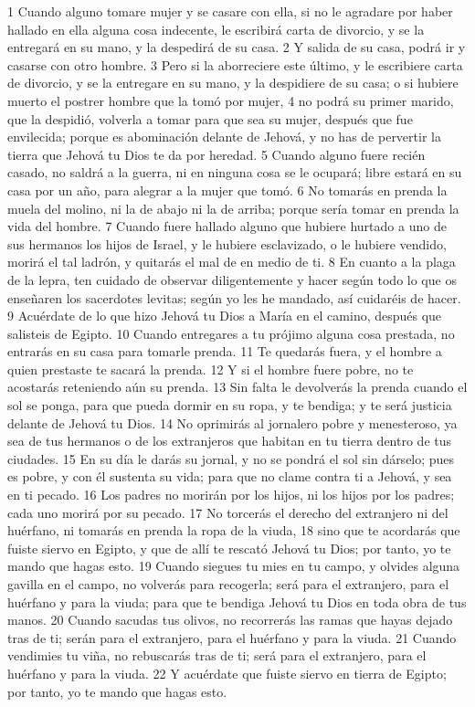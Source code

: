 1 Cuando alguno tomare mujer y se casare con ella, si no le agradare por haber hallado en ella alguna cosa indecente, le escribirá carta de divorcio, y se la entregará en su mano, y la despedirá de su casa.
2 Y salida de su casa, podrá ir y casarse con otro hombre.
3 Pero si la aborreciere este último, y le escribiere carta de divorcio, y se la entregare en su mano, y la despidiere de su casa; o si hubiere muerto el postrer hombre que la tomó por mujer,
4 no podrá su primer marido, que la despidió, volverla a tomar para que sea su mujer, después que fue envilecida; porque es abominación delante de Jehová, y no has de pervertir la tierra que Jehová tu Dios te da por heredad.
5 Cuando alguno fuere recién casado, no saldrá a la guerra, ni en ninguna cosa se le ocupará; libre estará en su casa por un año, para alegrar a la mujer que tomó.
6 No tomarás en prenda la muela del molino, ni la de abajo ni la de arriba; porque sería tomar en prenda la vida del hombre.
7 Cuando fuere hallado alguno que hubiere hurtado a uno de sus hermanos los hijos de Israel, y le hubiere esclavizado, o le hubiere vendido, morirá el tal ladrón, y quitarás el mal de en medio de ti.
8 En cuanto a la plaga de la lepra, ten cuidado de observar diligentemente y hacer según todo lo que os enseñaren los sacerdotes levitas; según yo les he mandado, así cuidaréis de hacer.
9 Acuérdate de lo que hizo Jehová tu Dios a María en el camino, después que salisteis de Egipto.
10 Cuando entregares a tu prójimo alguna cosa prestada, no entrarás en su casa para tomarle prenda.
11 Te quedarás fuera, y el hombre a quien prestaste te sacará la prenda.
12 Y si el hombre fuere pobre, no te acostarás reteniendo aún su prenda.
13 Sin falta le devolverás la prenda cuando el sol se ponga, para que pueda dormir en su ropa, y te bendiga; y te será justicia delante de Jehová tu Dios. 
14 No oprimirás al jornalero pobre y menesteroso, ya sea de tus hermanos o de los extranjeros que habitan en tu tierra dentro de tus ciudades.
15 En su día le darás su jornal, y no se pondrá el sol sin dárselo; pues es pobre, y con él sustenta su vida; para que no clame contra ti a Jehová, y sea en ti pecado. 
16 Los padres no morirán por los hijos, ni los hijos por los padres; cada uno morirá por su pecado. 
17 No torcerás el derecho del extranjero ni del huérfano, ni tomarás en prenda la ropa de la viuda,
18 sino que te acordarás que fuiste siervo en Egipto, y que de allí te rescató Jehová tu Dios; por tanto, yo te mando que hagas esto.
19 Cuando siegues tu mies en tu campo, y olvides alguna gavilla en el campo, no volverás para recogerla; será para el extranjero, para el huérfano y para la viuda; para que te bendiga Jehová tu Dios en toda obra de tus manos.
20 Cuando sacudas tus olivos, no recorrerás las ramas que hayas dejado tras de ti; serán para el extranjero, para el huérfano y para la viuda.
21 Cuando vendimies tu viña, no rebuscarás tras de ti; será para el extranjero, para el huérfano y para la viuda.
22 Y acuérdate que fuiste siervo en tierra de Egipto; por tanto, yo te mando que hagas esto.


